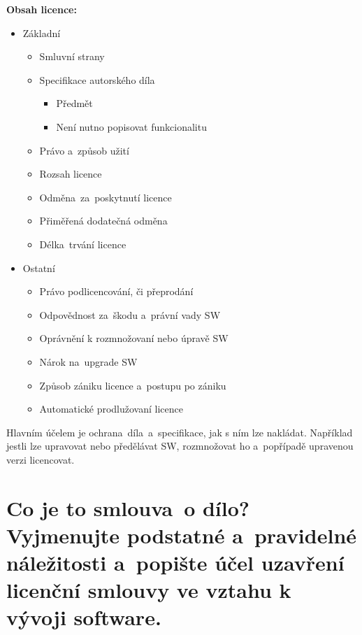 \noindent\textbf{Obsah licence:}
\begin{itemize}[noitemsep]
    \item Základní
          \begin{itemize}[noitemsep]
              \item Smluvní strany
              \item Specifikace autorského díla
                    \begin{itemize}[noitemsep]
                        \item Předmět
                        \item Není nutno popisovat funkcionalitu
                    \end{itemize}
              \item Právo a~způsob užití
              \item Rozsah licence
              \item Odměna~za~poskytnutí licence
              \item Přiměřená dodatečná odměna
              \item Délka~trvání licence
          \end{itemize}
    \item Ostatní
          \begin{itemize}[noitemsep]
              \item Právo podlicencování, či přeprodání
              \item Odpovědnost za~škodu a~právní vady SW
              \item Oprávnění k rozmnožovaní nebo úpravě SW
              \item Nárok na~upgrade SW
              \item Způsob zániku licence a~postupu po zániku
              \item Automatické prodlužovaní licence
          \end{itemize}
\end{itemize}

Hlavním účelem je ochrana~díla~a~specifikace, jak s ním lze nakládat. Například jestli lze upravovat nebo předělávat SW, rozmnožovat ho a~popřípadě upravenou verzi licencovat.


\section{Co je to smlouva~o dílo? Vyjmenujte podstatné a~pravidelné náležitosti a~popište účel uzavření licenční smlouvy ve vztahu k vývoji software.}

